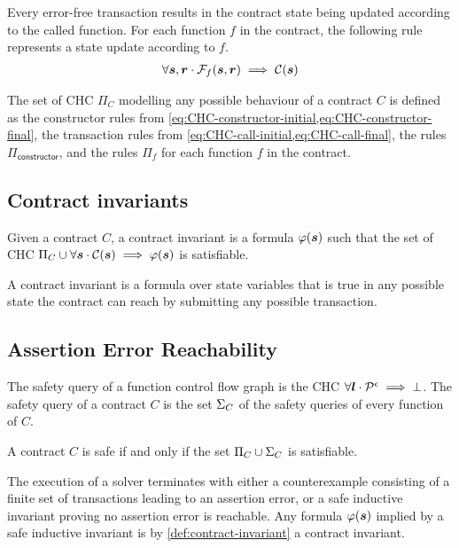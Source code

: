 Every error-free transaction results in the contract state being updated
according to the called function.
For each function $f$ in the contract, 
the following rule represents a state update
according to $f$.
\begin{align}
\label{eq:CHC-call-final}
\forall\svar,\rvar\cdot\finP_f(\svar,\rvar)\implies\conP(\svar)
\end{align}

The set of CHC $\Pi_C$ modelling any possible behaviour of
a contract $C$ is defined as the constructor rules from
\cref{eq:CHC-constructor-initial,eq:CHC-constructor-final},
the transaction rules from 
\cref{eq:CHC-call-initial,eq:CHC-call-final}, 
the rules $\Pi_\mathsf{constructor}$, and
the rules $\Pi_f$ for each function $f$ in the contract.

\subsection{Contract invariants}
\begin{definition}
\label{def:contract-invariant}
	Given a contract $C$, a contract invariant is a formula
	$\varphi(\boldsymbol{s})$ such that the set of CHC \mbox{$\Pi_C\cup\forall\boldsymbol{s}\cdot\mathcal{C}(\boldsymbol{s})\implies\varphi(\boldsymbol{s})$} is satisfiable.
\end{definition}
%
A contract invariant is a formula over state variables
that is true in any possible state the contract can reach
by submitting any possible transaction.

\subsection{Assertion Error Reachability}

\begin{definition}
	The safety query of a function control flow graph
	is the CHC
	\mbox{$\forall\boldsymbol{l}\cdot\mathcal{P}^\epsilon\implies\bot$}.
	The safety query of a contract $C$ is the set $\Sigma_C$ of 
	the safety queries of every function of $C$.
\end{definition}



\begin{definition}
	A contract $C$ is safe if and only if the set
	\mbox{$\Pi_C\cup\Sigma_C$} is satisfiable.
\end{definition}

The execution of a solver
terminates with either a counterexample consisting of a
finite set of transactions leading to an assertion error,
or a safe inductive invariant proving no assertion error
is reachable. Any formula $\varphi(\boldsymbol{s})$ implied by a
safe inductive invariant is by \cref{def:contract-invariant}
a contract invariant.

